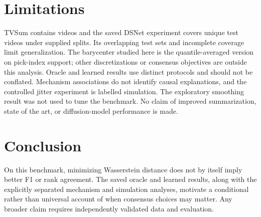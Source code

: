\documentclass[11pt,a4paper]{article}
\begin{document}
\section{Limitations}
TVSum contains \TVSumVideos{} videos and the saved DSNet experiment covers
\DSNetUniqueTestVideos{} unique test videos under \DSNetSplitCount{} supplied
splits. Its overlapping test sets and incomplete coverage limit
generalization. The barycenter studied here is the
\BarycenterDimension{}
quantile-averaged version on pick-index support; other discretizations or
consensus objectives are outside this analysis. Oracle and learned results
use distinct protocols and should not be conflated. Mechanism associations
do not identify causal explanations, and the controlled jitter experiment is
labelled simulation. The exploratory smoothing result was not used to tune
the benchmark. No claim of improved summarization, state of the art, or
diffusion-model performance is made.

\section{Conclusion}
On this benchmark, minimizing Wasserstein distance does not by itself imply
better F1 or rank agreement. The saved oracle and learned results, along with
the explicitly separated mechanism and simulation analyses, motivate a
conditional rather than universal account of when consensus choices may
matter. Any broader claim requires independently validated data and
evaluation.



\end{document}
